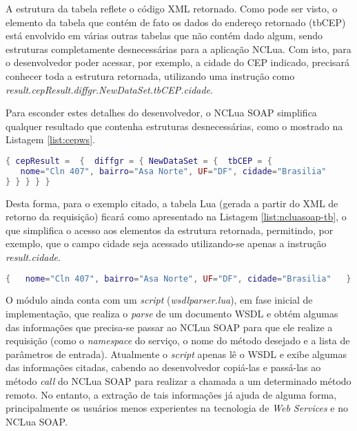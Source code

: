 A estrutura da tabela reflete o código XML retornado. Como pode ser visto, o elemento
da tabela que contém de fato os dados do endereço retornado (tbCEP) está envolvido em 
várias outras tabelas que não contém dado algum, sendo estruturas completamente
desnecessárias para a aplicação NCLua. Com isto, para o desenvolvedor
poder acessar, por exemplo, a cidade do CEP indicado, precisará 
conhecer toda a estrutura retornada, utilizando uma instrução como
\textit{result.cepResult.diffgr.NewDataSet.tbCEP.cidade}.

Para esconder estes detalhes do desenvolvedor, o NCLua SOAP simplifica qualquer
resultado que contenha estruturas desnecessárias, como o mostrado na Listagem \ref{list:cepws}.

\begin{lstlisting}[caption=Exemplo de tabela Lua gerada a partir do XML de uma resposta SOAP, label=list:cepws, language=lua]
{ cepResult =  {  diffgr = { NewDataSet = {  tbCEP = {
   nome="Cln 407", bairro="Asa Norte", UF="DF", cidade="Brasilia"
} } } } }
\end{lstlisting}

Desta forma, para o exemplo citado, a tabela Lua (gerada a partir do XML de retorno da requisição) 
ficará como apresentado na Listagem \ref{list:ncluasoap-tb}, o que simplifica
o acesso aos elementos da estrutura retornada, permitindo, por exemplo, que o campo
cidade seja acessado utilizando-se apenas a instrução \textit{result.cidade}.

\begin{lstlisting}[caption=Exemplo de simplificação de retorno de resposta SOAP pelo NCLua SOAP, label=list:ncluasoap-tb, language=lua]
{   nome="Cln 407", bairro="Asa Norte", UF="DF", cidade="Brasilia"   }
\end{lstlisting}

O módulo ainda conta com um \textit{script} (\textit{wsdlparser.lua}), em fase inicial de implementação, que realiza
o \textit{parse} de um documento WSDL e obtém algumas das informações que precisa-se
passar ao NCLua SOAP para que ele realize a requisição 
(como o \textit{namespace} do serviço, o nome do método desejado e a lista de parâmetros de entrada).
Atualmente o \textit{script} apenas lê o WSDL e exibe algumas
das informações citadas, cabendo ao desenvolvedor copiá-las e passá-las ao método \textit{call} do
NCLua SOAP para realizar a chamada a um determinado método remoto. No entanto, 
a extração de tais informações já ajuda de alguma forma, principalmente
os usuários menos experientes na tecnologia de \textit{Web Services} e no NCLua SOAP.

